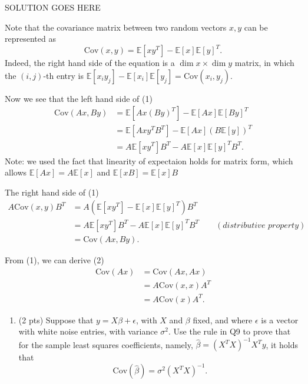\documentclass[
]{article}
\providecommand{\tightlist}{%
  \setlength{\itemsep}{0pt}\setlength{\parskip}{0pt}}
\begin{document}
SOLUTION GOES HERE

Note that the covariance matrix between two random vectors \(x,y\) can
be represented as
\[\mathrm{Cov}(x,y) = \mathbb{E}\left[xy^T\right] - \mathbb{E}\left[x\right]\mathbb{E}\left[y\right]^T.\]
Indeed, the right hand side of the equation is a
\(\dim x \times \dim y\) matrix, in which the \((i,j)\)-th entry is
\(\mathbb{E}[x_iy_j] - \mathbb{E}[x_i]\mathbb{E}[y_j]=\mathrm{Cov}(x_i,y_j)\).

Now we see that the left hand side of (1) \begin{align*}
    \mathrm{Cov}(Ax, By) & = \mathbb{E}\left[Ax(By)^T\right] - \mathbb{E}[Ax]\mathbb{E}[By]^T \\
    & = \mathbb{E}\left[Axy^TB^T\right] - \mathbb{E}[Ax]\left(B\mathbb{E}[y]\right)^T \\
    & = A\mathbb{E}\left[xy^T\right]B^T - A\mathbb{E}[x]\mathbb{E}[y]^TB^T.
\end{align*} Note: we used the fact that linearity of expectaion holds
for matrix form, which allows \(\mathbb{E}[Ax] = A\mathbb{E}[x]\) and
\(\mathbb{E}[xB] = \mathbb{E}[x]B\)

The right hand side of (1) \begin{align*}
    A\mathrm{Cov}(x,y)B^T & = A\left(\mathbb{E}\left[xy^T\right] - \mathbb{E}[x]\mathbb{E}[y]^T\right)B^T \\
    & = A\mathbb{E}\left[xy^T\right]B^T - A\mathbb{E}[x]\mathbb{E}[y]^TB^T \qquad (\textit{distributive property}) \\
    & = \mathrm{Cov}(Ax, By).
\end{align*}

From (1), we can derive (2) \begin{align*}
    \mathrm{Cov}(Ax) & = \mathrm{Cov}(Ax,Ax) \\
    & = A\mathrm{Cov}(x, x)A^T \\
    & = A\mathrm{Cov}(x)A^T.
\end{align*}

\begin{enumerate}
\def\labelenumi{\arabic{enumi}.}
\setcounter{enumi}{9}
\tightlist
\item
  (2 pts) Suppose that \(y = X \beta + \epsilon\), with \(X\) and
  \(\beta\) fixed, and where \(\epsilon\) is a vector with white noise
  entries, with variance \(\sigma^2\). Use the rule in Q9 to prove that
  for the sample least squares coefficients, namely,
  \(\hat\beta = (X^T X)^{-1} X^T y\), it holds that \[
  \mathrm{Cov}(\hat\beta) = \sigma^2 (X^T X)^{-1}.
  \]
\end{enumerate}
\end{document}
